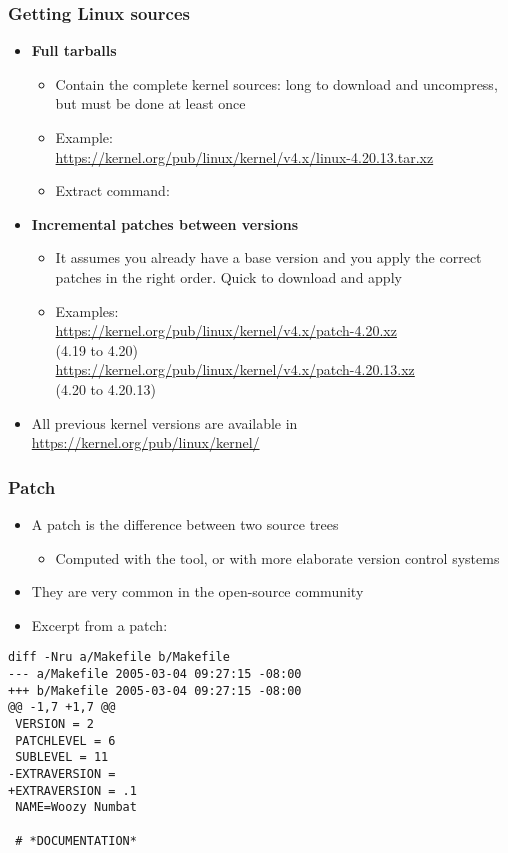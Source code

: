 \begin{frame}
  \frametitle{Getting Linux sources}
  \begin{itemize}
  \item {\bf Full tarballs}
    \begin{itemize}
    \item Contain the complete kernel sources: long to download and
      uncompress, but must be done at least once
    \item Example:\\
      \footnotesize
      \url{https://kernel.org/pub/linux/kernel/v4.x/linux-4.20.13.tar.xz}
      \normalsize
    \item Extract command:\\
      \footnotesize
      \normalsize
    \end{itemize}
  \item {\bf Incremental patches between versions}
    \begin{itemize}
    \item It assumes you already have a base version and you apply the
      correct patches in the right order. Quick to download and apply
    \item Examples:\\
      \scriptsize
      \url{https://kernel.org/pub/linux/kernel/v4.x/patch-4.20.xz}\\(4.19 to 4.20)\\
      \url{https://kernel.org/pub/linux/kernel/v4.x/patch-4.20.13.xz}\\(4.20 to 4.20.13)
    \end{itemize}
  \item All previous kernel versions are available in
    \url{https://kernel.org/pub/linux/kernel/}
  \end{itemize}
\end{frame}

\begin{frame}[fragile]
  \frametitle{Patch}
  \begin{itemize}
  \item A patch is the difference between two source trees
    \begin{itemize}
    \item Computed with the  tool, or with more elaborate
      version control systems
    \end{itemize}
  \item They are very common in the open-source community
  \item Excerpt from a patch:
  \end{itemize}
\footnotesize
\begin{verbatim}
diff -Nru a/Makefile b/Makefile
--- a/Makefile 2005-03-04 09:27:15 -08:00
+++ b/Makefile 2005-03-04 09:27:15 -08:00
@@ -1,7 +1,7 @@
 VERSION = 2
 PATCHLEVEL = 6
 SUBLEVEL = 11
-EXTRAVERSION =
+EXTRAVERSION = .1
 NAME=Woozy Numbat

 # *DOCUMENTATION*
\end{verbatim}
\end{frame}

